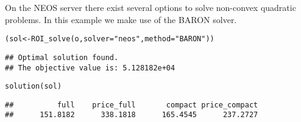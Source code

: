 \documentclass[a4paper]{article}\usepackage[]{graphicx}\usepackage[]{color}
\makeatletter
\newcommand{\hlstr}[1]{\textcolor[rgb]{0.741,0.553,0.545}{#1}}%
\newcommand{\hlstd}[1]{\textcolor[rgb]{0,0,0}{#1}}%
\newcommand{\hlkwb}[1]{\textcolor[rgb]{0.125,0.537,0.125}{#1}}%
\newcommand{\hlkwc}[1]{\textcolor[rgb]{0,0,1}{#1}}%
\newcommand{\hlkwd}[1]{\textcolor[rgb]{0,0,0}{#1}}%
\newenvironment{kframe}{%
 \def\at@end@of@kframe{}%
 \ifinner\ifhmode%
  \def\at@end@of@kframe{\end{minipage}}%
  \begin{minipage}{\columnwidth}%
 \fi\fi%
 \def\FrameCommand##1{\hskip\@totalleftmargin \hskip-\fboxsep
 \colorbox{shadecolor}{##1}\hskip-\fboxsep
     \hskip-\linewidth \hskip-\@totalleftmargin \hskip\columnwidth}%
 \MakeFramed {\advance\hsize-\width
   \@totalleftmargin\z@ \linewidth\hsize
   \@setminipage}}%
 {\par\unskip\endMakeFramed%
 \at@end@of@kframe}
\newenvironment{knitrout}{}{} %
\makeatother
\begin{document}
On the NEOS server there exist several options to solve non-convex
quadratic problems. In this example we make use of the BARON solver.
\begin{knitrout}
\color{fgcolor}\begin{kframe}
\begin{alltt}
\hlstd{(sol} \hlkwb{<-} \hlkwd{ROI_solve}\hlstd{(o,} \hlkwc{solver} \hlstd{=} \hlstr{"neos"}\hlstd{,} \hlkwc{method} \hlstd{=} \hlstr{"BARON"}\hlstd{))}
\end{alltt}
\begin{verbatim}
## Optimal solution found.
## The objective value is: 5.128182e+04
\end{verbatim}
\begin{alltt}
\hlkwd{solution}\hlstd{(sol)}
\end{alltt}
\begin{verbatim}
##          full    price_full       compact price_compact 
##      151.8182      338.1818      165.4545      237.2727
\end{verbatim}
\end{kframe}
\end{knitrout}




\end{document}
